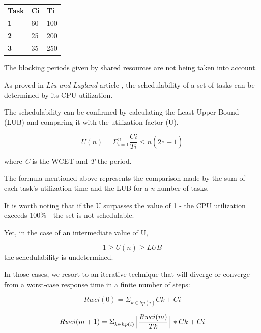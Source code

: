 \documentclass[11pt]{article}
\begin{document}
\begin{table}[H]
\begin{tabular}{lll}
\textbf{Task} & \textbf{Ci} & \textbf{Ti} \\
\textbf{1}    & 60         & 100           \\
\textbf{2}    & 25         & 200           \\
\textbf{3}    & 35         & 250          
\end{tabular}
\end{table}

The blocking periods given by shared resources are not being taken into account.

As proved in \textit{Liu and Layland} article\cite{liulayland} , the schedulability of a set of tasks can be determined by its CPU utilization.

The schedulability can be confirmed by calculating the Least Upper Bound (LUB) and comparing it with the utilization factor (U).

\begin{equation} 
	U(n) = \Sigma_{i=1}^n \frac{Ci}{Ti} \leq n(2^ \frac{1}{n} - 1)
\end{equation}

{\small where \emph{C} is the WCET and \emph{T} the period.}
\medskip
\medskip

The formula mentioned above represents the comparison made by the sum of each task's utilization time and the LUB for a \emph{n} number of tasks. 

It is worth noting that if the U surpasses the value of 1 - the CPU utilization exceeds 100\% - the set is not schedulable.

Yet, in the case of an intermediate value of U,

\begin{equation} 
	1 \geq U(n) \geq LUB
\end{equation}
\noindent
the schedulability is undetermined.
\medskip

In those cases, we resort to an iterative technique that will diverge or converge from a worst-case response time in a finite number of steps:

\begin{equation} 
	Rwci(0) = \Sigma_{k\in hp(i)}^{} Ck + Ci
\end{equation}

\begin{equation} \label{lub}
	Rwci(m+1) = \Sigma_{k\in hp(i)}^{}  \Bigl\lceil\dfrac{Rwci(m)}{Tk}\Bigr\rceil * Ck + Ci
\end{equation}
\end{document}

